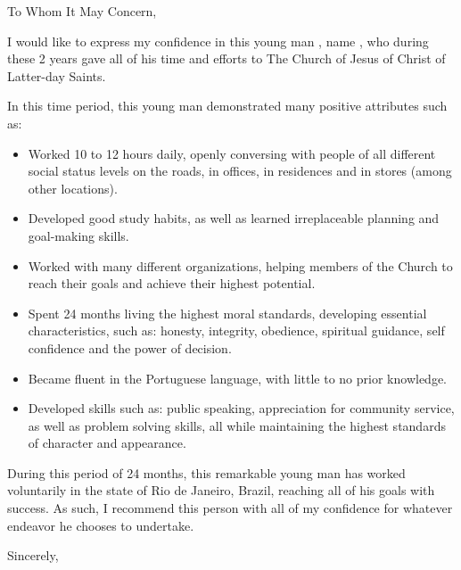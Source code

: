\documentclass[12pt]{letter}
\begin{document}
\begin{letter}{To Whom It May Concern,}

\opening{}

I would like to express my confidence in this young {{ man }}, {{ name }}, who during these 2 years gave all of {{ his }} time and efforts to The Church of Jesus of Christ of Latter-day Saints.

In this time period, this young {{ man }} demonstrated many positive attributes such as:

\begin{itemize}
	\item Worked 10 to 12 hours daily, openly conversing with people of all different social status levels on the roads, in offices, in residences and in stores (among other locations).
	\item Developed good study habits, as well as learned irreplaceable planning and goal-making skills.
	\item Worked with many different organizations, helping members of the Church to reach their goals and achieve their highest potential.
	\item Spent 24 months living the highest moral standards, developing essential characteristics, such as: honesty, integrity, obedience, spiritual guidance, self confidence and the power of decision.
	\item Became fluent in the Portuguese language, with little to no prior knowledge.
	\item Developed skills such as: public speaking, appreciation for community service, as well as problem solving skills, all while maintaining the highest standards of character and appearance.
\end{itemize}

During this period of 24 months, this remarkable young {{ man }} has worked voluntarily in the state of Rio de Janeiro, Brazil, reaching all of {{ his }} goals with success. As such, I recommend this person with all of my confidence for whatever endeavor {{ he }} chooses to undertake.

\closing{Sincerely,}
\end{letter}
\end{document}

